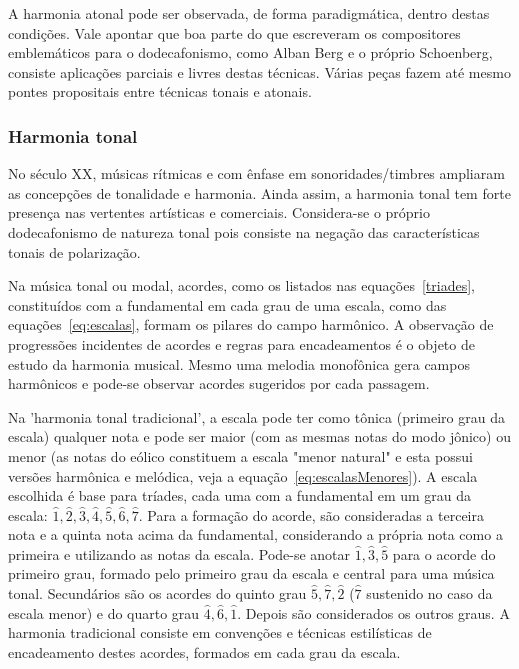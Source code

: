 A harmonia atonal pode ser observada, de forma paradigmática, dentro destas condições.
Vale apontar que boa parte do que escreveram os compositores
emblemáticos para o dodecafonismo, como Alban Berg e o próprio Schoenberg, consiste
aplicações parciais e livres destas técnicas. Várias peças fazem até mesmo pontes
propositais entre técnicas tonais e atonais.

\subsubsection{Harmonia tonal}
No século XX, músicas rítmicas
e com ênfase em sonoridades/timbres ampliaram 
as concepções de tonalidade e harmonia. Ainda assim, a harmonia tonal tem forte presença
nas vertentes artísticas e comerciais. Considera-se o próprio dodecafonismo de natureza
tonal pois consiste na negação das características tonais de polarização.

Na música tonal ou modal, acordes, como os listados nas equações~\ref{triades}, constituídos com a fundamental em cada
grau de uma escala, como das equações~\ref{eq:escalas}, formam os pilares do campo harmônico.
A observação de progressões incidentes de acordes e regras para encadeamentos é o objeto de estudo da harmonia musical.
Mesmo uma melodia monofônica gera campos harmônicos e pode-se observar acordes sugeridos por cada passagem.



Na 'harmonia tonal tradicional',
a escala pode ter como tônica (primeiro grau da escala) qualquer nota e pode ser maior (com as mesmas notas do modo jônico) ou menor (as notas do eólico constituem a escala "menor natural" e esta possui versões harmônica e melódica, veja a equação~\ref{eq:escalasMenores}). A escala escolhida é
base para tríades, cada uma com a fundamental em um grau 
da escala: $\hat{1},\hat{2},\hat{3},\hat{4},\hat{5},\hat{6},\hat{7}$. Para a formação do acorde, são consideradas a terceira nota e a quinta nota acima da fundamental, considerando a própria nota como a primeira e utilizando as notas da escala.
Pode-se anotar $\hat{1},\hat{3},\hat{5}$ para o acorde do primeiro grau, formado pelo primeiro grau da escala e central para uma música tonal. Secundários são os acordes do quinto grau $\hat{5},\hat{7},\hat{2}$ ($\hat{7}$ sustenido no caso da escala menor) e do quarto grau $\hat{4},\hat{6},\hat{1}$. Depois são considerados os outros graus. A harmonia tradicional consiste em convenções e técnicas estilísticas de encadeamento destes acordes, formados em cada grau da escala.\cite{Harmonia}

